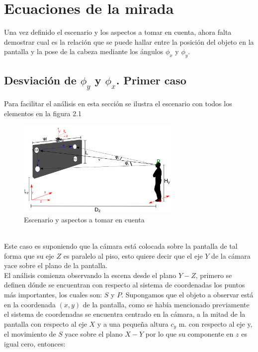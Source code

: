     \section{Ecuaciones de la mirada}
    Una vez definido el escenario y los aspectos a tomar en cuenta, ahora falta demostrar cual es la relación que se puede hallar entre la posición del objeto en la pantalla y la pose de la cabeza mediante los ángulos $\phi_x$ y $\phi_y$.
    
    \subsection{Desviación de $\phi_y$ y $\phi_x$. Primer caso}
    Para facilitar el análisis en esta sección se ilustra el escenario con todos los elementos en la figura 2.1
    \begin{figure}[htbp]
    	\centering
    	\includegraphics[width=0.7\textwidth]{./pictures/escenario}
    	\caption{Escenario y aspectos a tomar en cuenta}\label{fig: figura}
    \end{figure}
    \\Este caso es suponiendo que la cámara está colocada sobre la pantalla de tal forma que su eje $Z$ es paralelo al piso, esto quiere decir que el eje $Y$ de la cámara yace sobre el plano de la pantalla.\\
     El análisis comienza observando la escena desde el plano $Y-Z$, primero se definen dónde se encuentran con respecto al sistema de coordenadas los puntos más importantes, los cuales son: $S$ y $P$. Supongamos que el objeto a observar está en la coordenada $(x,y)$ de la pantalla, como se había mencionado previamente el sistema de coordenadas se encuentra centrado en la cámara,  a la mitad de la pantalla con respecto al eje $X$ y a una pequeña altura $c_y$ m. con respecto al eje y, el movimiento de $S$ yace sobre el plano $X-Y$ por lo que su componente en $z$ es igual cero, entonces:
    
